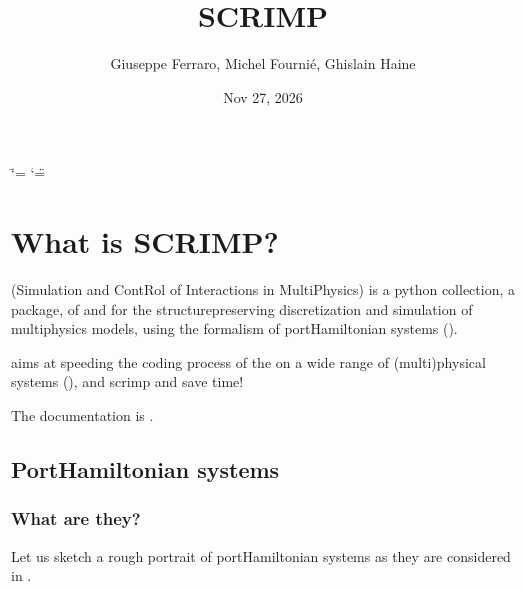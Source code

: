 \documentclass[letterpaper,10pt,english]{sphinxmanual}
\title{SCRIMP}
\date{Nov 27, 2026}
\author{Giuseppe Ferraro, Michel Fournié, Ghislain Haine}
\let\sphinxpxdimen\pdfpxdimen\else\newdimen\sphinxpxdimen
\begin{document}
\ifdefined\shorthandoff
  \ifnum\catcode`\=\string=\active\shorthandoff{=}\fi
  \ifnum\catcode`\"=\active{}\fi
\fi

\pagestyle{empty}
\sphinxmaketitle
\pagestyle{plain}
\sphinxtableofcontents
\pagestyle{normal}
\label{\detokenize{index::doc}}


\sphinxAtStartPar
{}

\noindent{\hspace*{\fill}\sphinxincludegraphics[width=600\sphinxpxdimen,height=200\sphinxpxdimen]{{workflow}.png}\hspace*{\fill}}


\chapter{What is SCRIMP?}
\label{\detokenize{index:what-is-scrimp}}
\sphinxAtStartPar
{} (Simulation and ContRol of Interactions in Multi\sphinxhyphen{}Physics) is a python collection,  a package, of  and  for the structure\sphinxhyphen{}preserving discretization and simulation of multi\sphinxhyphen{}physics models, using the formalism of port\sphinxhyphen{}Hamiltonian systems ().

\sphinxAtStartPar
{} aims at speeding the coding process of the  on a wide range of (multi\sphinxhyphen{})physical systems (), and scrimp and save time!

\sphinxAtStartPar
The documentation is .


\section{Port\sphinxhyphen{}Hamiltonian systems}
\label{\detokenize{index:port-hamiltonian-systems}}

\subsection{What are they?}
\label{\detokenize{index:what-are-they}}
\sphinxAtStartPar
Let us sketch a rough portrait of port\sphinxhyphen{}Hamiltonian systems as they are considered in .
\end{document}
